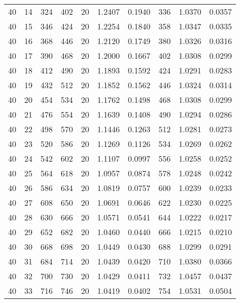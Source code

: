 \documentclass[a4paper,twopages]{article}
\begin{document}
\begin{table*}
{\begin{tabular}{|r|r|r||r|r|r|r||r|r|r|}
       40 &14 &    324 &    402 &    20 &   1.2407 &  0.1940 &  336 &   1.0370 &  0.0357\\
       40 &15 &    346 &    424 &    20 &   1.2254 &  0.1840 &  358 &   1.0347 &  0.0335\\
       40 &16 &    368 &    446 &    20 &   1.2120 &  0.1749 &  380 &   1.0326 &  0.0316\\
       40 &17 &    390 &    468 &    20 &   1.2000 &  0.1667 &  402 &   1.0308 &  0.0299\\
       40 &18 &    412 &    490 &    20 &   1.1893 &  0.1592 &  424 &   1.0291 &  0.0283\\
       40 &19 &    432 &    512 &    20 &   1.1852 &  0.1562 &  446 &   1.0324 &  0.0314\\
       40 &20 &    454 &    534 &    20 &   1.1762 &  0.1498 &  468 &   1.0308 &  0.0299\\
       40 &21 &    476 &    554 &    20 &   1.1639 &  0.1408 &  490 &   1.0294 &  0.0286\\
       40 &22 &    498 &    570 &    20 &   1.1446 &  0.1263 &  512 &   1.0281 &  0.0273\\
       40 &23 &    520 &    586 &    20 &   1.1269 &  0.1126 &  534 &   1.0269 &  0.0262\\
       40 &24 &    542 &    602 &    20 &   1.1107 &  0.0997 &  556 &   1.0258 &  0.0252\\
       40 &25 &    564 &    618 &    20 &   1.0957 &  0.0874 &  578 &   1.0248 &  0.0242\\
       40 &26 &    586 &    634 &    20 &   1.0819 &  0.0757 &  600 &   1.0239 &  0.0233\\
       40 &27 &    608 &    650 &    20 &   1.0691 &  0.0646 &  622 &   1.0230 &  0.0225\\
       40 &28 &    630 &    666 &    20 &   1.0571 &  0.0541 &  644 &   1.0222 &  0.0217\\
       40 &29 &    652 &    682 &    20 &   1.0460 &  0.0440 &  666 &   1.0215 &  0.0210\\
       40 &30 &    668 &    698 &    20 &   1.0449 &  0.0430 &  688 &   1.0299 &  0.0291\\
       40 &31 &    684 &    714 &    20 &   1.0439 &  0.0420 &  710 &   1.0380 &  0.0366\\
       40 &32 &    700 &    730 &    20 &   1.0429 &  0.0411 &  732 &   1.0457 &  0.0437\\
       40 &33 &    716 &    746 &    20 &   1.0419 &  0.0402 &  754 &   1.0531 &  0.0504\\

\end{tabular}}
\end{table*}
\end{document}
